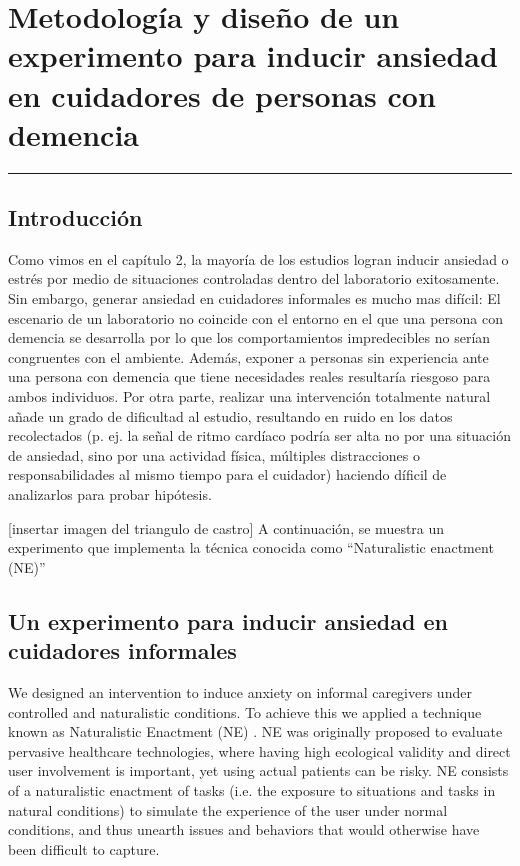 \chapter{Metodolog\'ia y dise\~no de un experimento para inducir ansiedad en cuidadores de personas con demencia}\label{capit:cap3}
\vspace{-2.0325ex}%
\noindent
\rule{\textwidth}{0.5pt}
\vspace{-5.5ex}%
\newcommand{\pushline}{\Indp}%
\section{Introducci\'on}\label{secc:introduction}

Como vimos en el cap\'itulo 2, la mayor\'ia de los estudios logran inducir ansiedad o estr\'es por medio de situaciones controladas dentro del laboratorio exitosamente. Sin embargo, generar ansiedad en cuidadores informales es mucho mas dif\'icil: El escenario de un laboratorio no coincide con el entorno en el que una persona con demencia se desarrolla por lo que los comportamientos impredecibles no ser\'ian congruentes con el ambiente. Adem\'as, exponer a personas sin experiencia ante una persona con demencia que tiene necesidades reales resultar\'ia riesgoso para ambos individuos. Por otra parte, realizar una intervenci\'on totalmente natural a\~nade un grado de dificultad al estudio, resultando en ruido en los datos recolectados (p. ej. la se\~nal de ritmo card\'iaco podr\'ia ser alta no por una situaci\'on de ansiedad, sino por una actividad f\'isica, m\'ultiples distracciones o responsabilidades al mismo tiempo para el cuidador) haciendo d\'ificil de analizarlos para probar hip\'otesis.


[insertar imagen del triangulo de castro]
A continuaci\'on, se muestra un experimento que implementa la  t\'ecnica conocida como ``Naturalistic enactment (NE)'' \cite{Castro11}


\section{Un experimento para inducir ansiedad en cuidadores informales}
We designed an intervention to induce anxiety on informal
caregivers under controlled and naturalistic conditions.
To achieve this we applied a technique known as Naturalistic
Enactment (NE) \cite{Castro11}. NE was originally proposed
to evaluate pervasive healthcare technologies, where having
high ecological validity and direct user involvement is 
important, yet using actual patients can be risky. NE consists
of a naturalistic enactment of tasks (i.e. the exposure to 
situations and tasks in natural conditions) to simulate 
the experience of the user under normal conditions, and 
thus unearth issues and behaviors that would otherwise have
been difficult to capture. 

